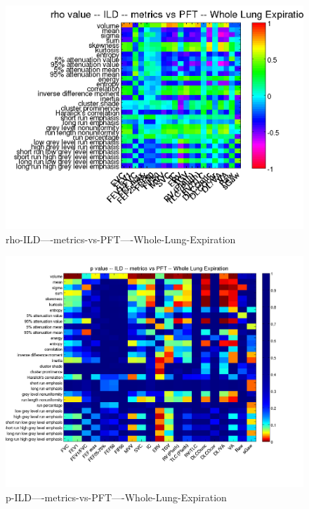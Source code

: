 \documentclass[12pt]{article}
\begin{document}
\begin{figure}
    \includegraphics[width=0.84\linewidth,viewport=100 60 620 550]{corr/rho-ILD----metrics-vs-PFT----Whole-Lung-Expiration.png}
    \caption{rho-ILD----metrics-vs-PFT----Whole-Lung-Expiration}
    \label{fig:rho-ILD----metrics-vs-PFT----Whole-Lung-Expiration}
\end{figure}
\begin{figure}
    \includegraphics[width=0.84\linewidth,viewport=100 60 620 550]{corr/p-ILD----metrics-vs-PFT----Whole-Lung-Expiration.png}
    \caption{p-ILD----metrics-vs-PFT----Whole-Lung-Expiration}
    \label{fig:p-ILD----metrics-vs-PFT----Whole-Lung-Expiration}
\end{figure}
\end{document}
